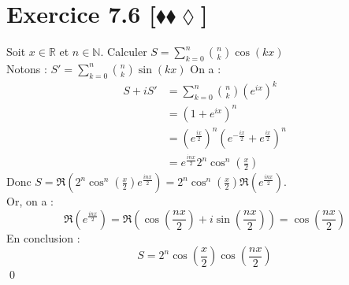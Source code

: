 \documentclass[10pt]{article}
\begin{document}

\section*{Exercice 7.6 [$\blacklozenge\blacklozenge\lozenge$]}
\begin{tcolorbox}[enhanced, width=7in, center, size=fbox, fontupper=\large, drop shadow southwest]
    Soit $x\in\mathbb{R}$ et $n\in\mathbb{N}$. Calculer $S=\sum\limits_{k=0}^{n}{\binom{n}{k}\cos(kx)}$\\
    Notons : $S'=\sum\limits_{k=0}^{n}{\binom{n}{k}\sin(kx)}$
    On a :
    \begin{align*}
        S + iS' &= \sum_{k=0}^{n}{\binom{n}{k}\left(e^{ix}\right)^k}\\
        &= (1 + e^{ix})^n\\
        &= \left( e^{\frac{ix}{2}} \right)^n\left( e^{-\frac{ix}{2}} + e^{\frac{ix}{2}}\right)^n\\
        &= e^{\frac{inx}{2}}2^n\cos^n\left(\frac{x}{2}\right)
    \end{align*}
    Donc $S = \Re\left( 2^n\cos^n\left( \frac{x}{2} \right)e^{\frac{inx}{2}} \right) = 2^n\cos^n\left( \frac{x}{2} \right)\Re\left( e^{\frac{inx}{2}} \right)$.\\
    Or, on a :
    \begin{equation*}
        \Re\left( e^{\frac{inx}{2}} \right) = \Re\left( \cos\left(\frac{nx}{2}\right) + i\sin\left(\frac{nx}{2}\right) \right) = \cos\left( \frac{nx}{2} \right)
    \end{equation*}
    En conclusion :
    \begin{equation*}
        S = 2^n \cos\left( \frac{x}{2} \right)\cos\left(\frac{nx}{2}\right)
    \end{equation*}
    \qed
\end{tcolorbox}

\end{document}
